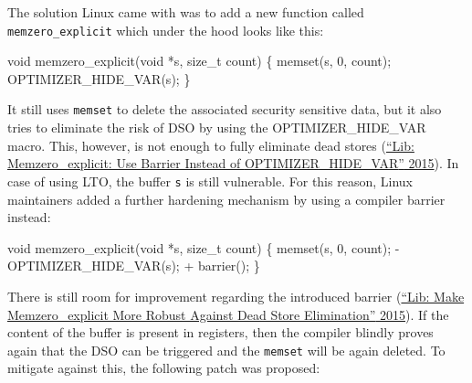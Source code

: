 \documentclass[
  a4paper,
]{report}
\newenvironment{Shaded}{}{}
\newcommand{\DataTypeTok}[1]{\textcolor[rgb]{0.56,0.13,0.00}{#1}}
\newcommand{\DecValTok}[1]{\textcolor[rgb]{0.25,0.63,0.44}{#1}}
\newcommand{\NormalTok}[1]{#1}
\newcommand{\OperatorTok}[1]{\textcolor[rgb]{0.40,0.40,0.40}{#1}}
\begin{document}
The solution Linux came with was to add a new function called
\texttt{memzero\_explicit} which under the hood looks like this:

\begin{Shaded}
\begin{Highlighting}[]
\DataTypeTok{void}\NormalTok{ memzero\_explicit}\OperatorTok{(}\DataTypeTok{void} \OperatorTok{*}\NormalTok{s}\OperatorTok{,} \DataTypeTok{size\_t}\NormalTok{ count}\OperatorTok{)}
\OperatorTok{\{}
\NormalTok{  memset}\OperatorTok{(}\NormalTok{s}\OperatorTok{,} \DecValTok{0}\OperatorTok{,}\NormalTok{ count}\OperatorTok{);}
\NormalTok{  OPTIMIZER\_HIDE\_VAR}\OperatorTok{(}\NormalTok{s}\OperatorTok{);}
\OperatorTok{\}}
\end{Highlighting}
\end{Shaded}

It still uses \texttt{memset}  to delete the associated
security sensitive data, but it also tries to eliminate the risk of DSO
by using the OPTIMIZER\_HIDE\_VAR macro. This, however, is not enough to
fully eliminate dead stores
(\protect\hyperlink{ref-MemZeroBarrier}{{``Lib: Memzero\_explicit: Use
Barrier Instead of {OPTIMIZER\_HIDE\_VAR}''} 2015}). In case of using
LTO, the buffer \texttt{s} is still vulnerable. For this reason, Linux
maintainers added a further hardening mechanism by using a compiler
barrier instead:

\begin{Shaded}
\begin{Highlighting}[]
\DataTypeTok{void}\NormalTok{ memzero\_explicit}\OperatorTok{(}\DataTypeTok{void} \OperatorTok{*}\NormalTok{s}\OperatorTok{,} \DataTypeTok{size\_t}\NormalTok{ count}\OperatorTok{)}
\OperatorTok{\{}
\NormalTok{  memset}\OperatorTok{(}\NormalTok{s}\OperatorTok{,} \DecValTok{0}\OperatorTok{,}\NormalTok{ count}\OperatorTok{);}
  \OperatorTok{{-}}\NormalTok{ OPTIMIZER\_HIDE\_VAR}\OperatorTok{(}\NormalTok{s}\OperatorTok{);}
  \OperatorTok{+}\NormalTok{ barrier}\OperatorTok{();}
\OperatorTok{\}}
\end{Highlighting}
\end{Shaded}

There is still room for improvement regarding the introduced barrier
(\protect\hyperlink{ref-MemZeroDataBarrier}{{``Lib: Make
Memzero\_explicit More Robust Against Dead Store Elimination''} 2015}).
If the content of the buffer is present in registers, then the compiler
blindly proves again that the DSO can be triggered and the
\texttt{memset} will be again deleted. To mitigate against this, the
following patch was proposed:
\end{document}
